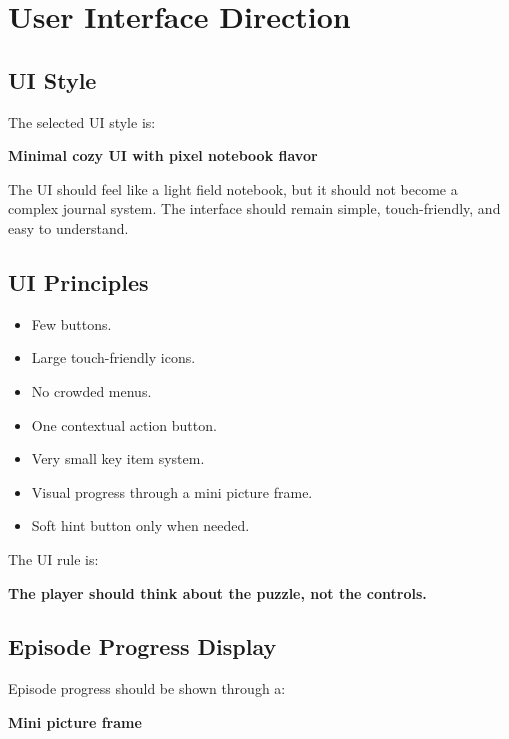 \documentclass[12pt]{article}
\begin{document}
\section{User Interface Direction}

\subsection{UI Style}

The selected UI style is:

\begin{center}
\textbf{Minimal cozy UI with pixel notebook flavor}
\end{center}

The UI should feel like a light field notebook, but it should not become a complex journal system. The interface should remain simple, touch-friendly, and easy to understand.

\subsection{UI Principles}

\begin{itemize}[leftmargin=*]
    \item Few buttons.
    \item Large touch-friendly icons.
    \item No crowded menus.
    \item One contextual action button.
    \item Very small key item system.
    \item Visual progress through a mini picture frame.
    \item Soft hint button only when needed.
\end{itemize}

The UI rule is:

\begin{center}
\textbf{The player should think about the puzzle, not the controls.}
\end{center}

\subsection{Episode Progress Display}

Episode progress should be shown through a:

\begin{center}
\textbf{Mini picture frame}
\end{center}
\end{document}
